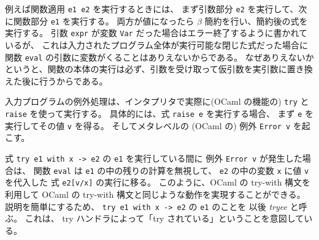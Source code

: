 例えば関数適用 \texttt{e1 e2} を実行するときには、
まず引数部分 \texttt{e2} を実行して、次に関数部分 \texttt{e1} を実行する。
両方が値になったら $\beta$ 簡約を行い、簡約後の式を実行する。
引数 \texttt{expr} が変数 \texttt{Var} だった場合はエラー終了するように書かれているが、
これは入力されたプログラム全体が実行可能な閉じた式だった場合に
関数 \texttt{eval} の引数に変数がくることはありえないからである。
なぜありえないかというと、関数の本体の実行は必ず、引数を受け取って仮引数を実引数に置き換えた後に行うからである。

入力プログラムの例外処理は、インタプリタで実際に(OCaml の機能の) \texttt{try} と \texttt{raise} を使って実行する。
具体的には、式 \texttt{raise e} を実行する場合、
まず \texttt{e} を実行してその値 \texttt{v} を得る。
そしてメタレベルの (OCaml の) 例外 \texttt{Error v} を起こす。

式 \texttt{try e1 with x -> e2} の \texttt{e1} を実行している間に
例外 \texttt{Error v} が発生した場合は、
関数 \texttt{eval} は \texttt{e1} の中の残りの計算を無視して、
\texttt{e2} の中の変数 \texttt{x} に値 \texttt{v} を代入した
式 \texttt{e2[v/x]} の実行に移る。
このように、OCaml の try-with 構文を利用して OCaml の try-with 構文と同じような動作を実現することができる。
説明を簡単にするため、 \texttt{try e1 with x -> e2} の \texttt{e1} のことを
以後 \emph{tryee} と呼ぶ。
これは、 try ハンドラによって「try されている」ということを意図している。


